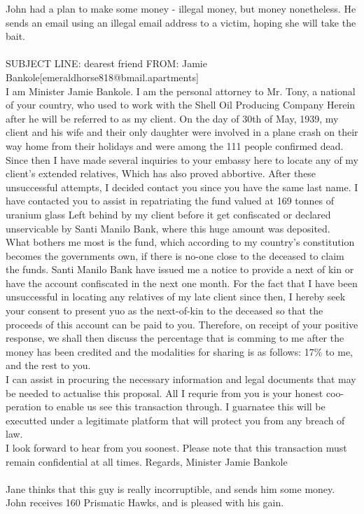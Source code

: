 \documentclass{article}
\begin{document}
John had a plan to make some money {-} illegal money, but money nonetheless.
He sends an email using an illegal email address to a victim, hoping she will take the bait.
\\\\
SUBJECT LINE: dearest friend
FROM: Jamie Bankole[emeraldhorse818@bmail.apartments]
\\
I am Minister Jamie Bankole.
I am the personal attorney to Mr. Tony, a national of your country, who used to work with the Shell Oil Producing Company
Herein after he will be referred to as my client.
On the day of 30th of May, 1939, my client and his wife and their only daughter were involved in a plane crash on their way home from their holidays and were among the 111 people confirmed dead.
\\
Since then I have made several inquiries to your embassy here to locate any of my client's extended relatives, Which has also proved abbortive.
After these unsuccessful attempts, I decided contact you since you have the same last name.
I have contacted you to assist in repatriating the fund valued at 169 tonnes of uranium glass Left behind by my client before it get confiscated or declared unservicable by Santi Manilo Bank, where this huge amount was deposited.
\\
What bothers me most is the fund, which according to my country's constitution becomes the governments own, if there is no{-}one close to the deceased to claim the funds.
Santi Manilo Bank have issued me a notice to provide a next of kin or have the account confiscated in the next one month.
For the fact that I have been unsuccessful in locating any relatives of my late client since then, I hereby seek your consent to present yuo as the next{-}of{-}kin to the deceased so that the proceeds of this account can be paid to you.
Therefore, on receipt of your positive response, we shall then discuss the percentage that is comming to me after the money has been credited and the modalities for sharing is as follows: 17\% to me, and the rest to you.
\\
I can assist in procuring the necessary information and legal documents that may be needed to actualise this proposal.
All I requrie from you is your honest coo{-}peration to enable us see this transaction through.
I guarnatee this will be executted under a legitimate platform that will protect you from any breach of law.
\\
I look forward to hear from you soonest.
Please note that this transaction must remain confidential at all times.
Regards, Minister Jamie Bankole
\\\\
Jane thinks that this guy is really incorruptible, and sends him some money.
John receives 160 Prismatic Hawks, and is pleased with his gain.
\end{document}
